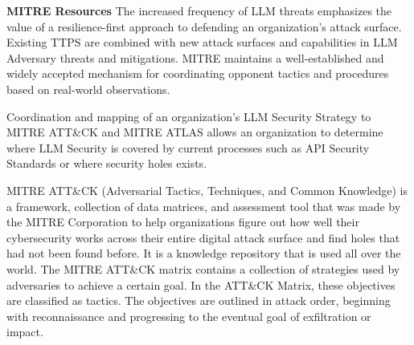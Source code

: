 \clearpage
\textbf{MITRE Resources}
The increased frequency of LLM threats emphasizes the value of a
resilience-first approach to defending an organization's attack surface.
Existing TTPS are combined with new attack surfaces and capabilities in LLM
Adversary threats and mitigations. MITRE maintains a well-established and
widely accepted mechanism for coordinating opponent tactics and procedures
based on real-world observations.

Coordination and mapping of an organization's LLM Security Strategy to MITRE
ATT\&CK and MITRE ATLAS allows an organization to determine where LLM Security
is covered by current processes such as API Security Standards or where
security holes exists.

MITRE ATT\&CK (Adversarial Tactics, Techniques, and Common Knowledge) is a
framework, collection of data matrices, and assessment tool that was made by
the MITRE Corporation to help organizations figure out how well their
cybersecurity works across their entire digital attack surface and find holes
that had not been found before. It is a knowledge repository that is used all
over the world. The MITRE ATT\&CK matrix contains a collection of strategies
used by adversaries to achieve a certain goal. In the ATT\&CK Matrix, these
objectives are classified as tactics. The objectives are outlined in attack
order, beginning with reconnaissance and progressing to the eventual goal of
exfiltration or impact.

